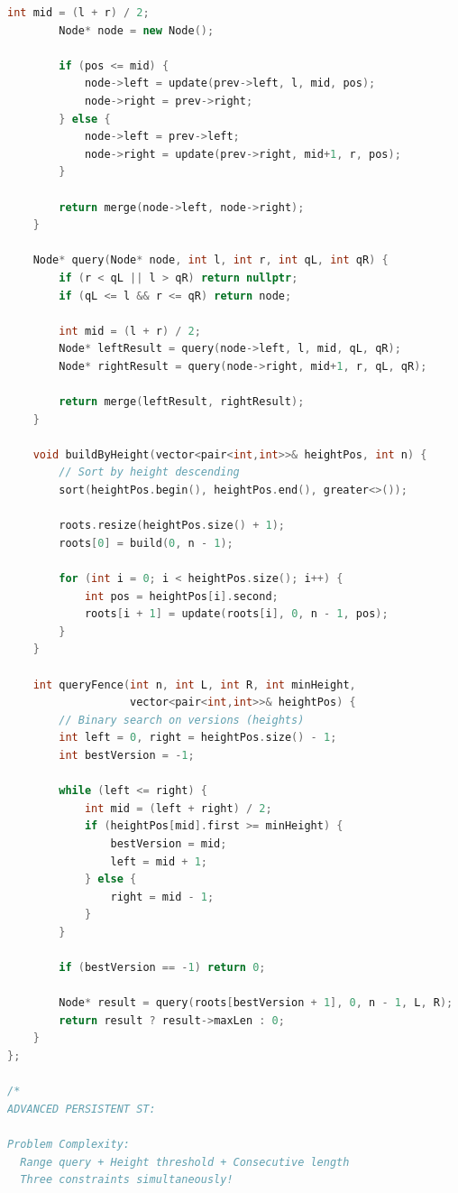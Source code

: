 \documentclass[11pt,a4paper,oneside]{book}
\begin{document}
\begin{lstlisting}[language=C++, caption=10+ COMPLETE DETAILED SOLUTIONS]
        int mid = (l + r) / 2;
        Node* node = new Node();
        
        if (pos <= mid) {
            node->left = update(prev->left, l, mid, pos);
            node->right = prev->right;
        } else {
            node->left = prev->left;
            node->right = update(prev->right, mid+1, r, pos);
        }
        
        return merge(node->left, node->right);
    }
    
    Node* query(Node* node, int l, int r, int qL, int qR) {
        if (r < qL || l > qR) return nullptr;
        if (qL <= l && r <= qR) return node;
        
        int mid = (l + r) / 2;
        Node* leftResult = query(node->left, l, mid, qL, qR);
        Node* rightResult = query(node->right, mid+1, r, qL, qR);
        
        return merge(leftResult, rightResult);
    }
    
    void buildByHeight(vector<pair<int,int>>& heightPos, int n) {
        // Sort by height descending
        sort(heightPos.begin(), heightPos.end(), greater<>());
        
        roots.resize(heightPos.size() + 1);
        roots[0] = build(0, n - 1);
        
        for (int i = 0; i < heightPos.size(); i++) {
            int pos = heightPos[i].second;
            roots[i + 1] = update(roots[i], 0, n - 1, pos);
        }
    }
    
    int queryFence(int n, int L, int R, int minHeight, 
                   vector<pair<int,int>>& heightPos) {
        // Binary search on versions (heights)
        int left = 0, right = heightPos.size() - 1;
        int bestVersion = -1;
        
        while (left <= right) {
            int mid = (left + right) / 2;
            if (heightPos[mid].first >= minHeight) {
                bestVersion = mid;
                left = mid + 1;
            } else {
                right = mid - 1;
            }
        }
        
        if (bestVersion == -1) return 0;
        
        Node* result = query(roots[bestVersion + 1], 0, n - 1, L, R);
        return result ? result->maxLen : 0;
    }
};

/*
ADVANCED PERSISTENT ST:

Problem Complexity:
  Range query + Height threshold + Consecutive length
  Three constraints simultaneously!


\end{lstlisting}
\end{document}
